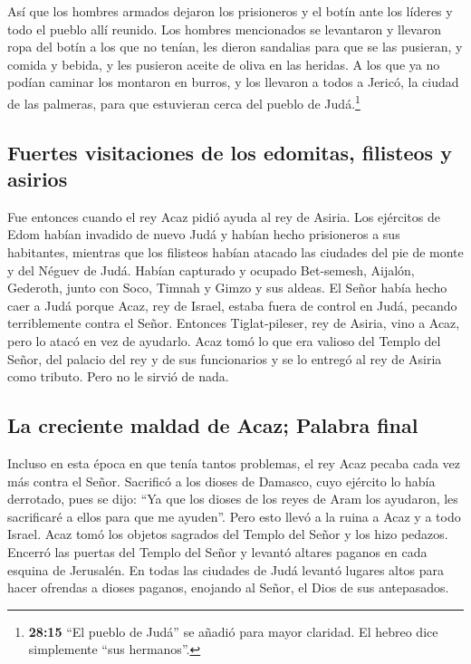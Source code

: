  Así que los hombres armados dejaron los prisioneros y el
botín ante los líderes y todo el pueblo allí reunido. 
Los hombres mencionados se levantaron y llevaron ropa del botín a los
que no tenían, les dieron sandalias para que se las pusieran, y comida y
bebida, y les pusieron aceite de oliva en las heridas. A los que ya no
podían caminar los montaron en burros, y los llevaron a todos a Jericó,
la ciudad de las palmeras, para que estuvieran cerca del pueblo de
Judá.\footnote{\textbf{28:15} ``El pueblo de Judá'' se añadió para mayor
  claridad. El hebreo dice simplemente ``sus hermanos''.}

\hypertarget{fuertes-visitaciones-de-los-edomitas-filisteos-y-asirios}{%
\subsection{Fuertes visitaciones de los edomitas, filisteos y
asirios}\label{fuertes-visitaciones-de-los-edomitas-filisteos-y-asirios}}

 Fue entonces cuando el rey Acaz pidió ayuda al rey de
Asiria.  Los ejércitos de Edom habían invadido de nuevo
Judá y habían hecho prisioneros a sus habitantes, 
mientras que los filisteos habían atacado las ciudades del pie de monte
y del Néguev de Judá. Habían capturado y ocupado Bet-semesh, Aijalón,
Gederoth, junto con Soco, Timnah y Gimzo y sus aldeas. 
El Señor había hecho caer a Judá porque Acaz, rey de Israel, estaba
fuera de control en Judá, pecando terriblemente contra el Señor.
 Entonces Tiglat-pileser, rey de Asiria, vino a Acaz,
pero lo atacó en vez de ayudarlo.  Acaz tomó lo que era
valioso del Templo del Señor, del palacio del rey y de sus funcionarios
y se lo entregó al rey de Asiria como tributo. Pero no le sirvió de
nada.

\hypertarget{la-creciente-maldad-de-acaz-palabra-final}{%
\subsection{La creciente maldad de Acaz; Palabra
final}\label{la-creciente-maldad-de-acaz-palabra-final}}

 Incluso en esta época en que tenía tantos problemas, el
rey Acaz pecaba cada vez más contra el Señor.  Sacrificó
a los dioses de Damasco, cuyo ejército lo había derrotado, pues se dijo:
``Ya que los dioses de los reyes de Aram los ayudaron, les sacrificaré a
ellos para que me ayuden''. Pero esto llevó a la ruina a Acaz y a todo
Israel.  Acaz tomó los objetos sagrados del Templo del
Señor y los hizo pedazos. Encerró las puertas del Templo del Señor y
levantó altares paganos en cada esquina de Jerusalén.  En
todas las ciudades de Judá levantó lugares altos para hacer ofrendas a
dioses paganos, enojando al Señor, el Dios de sus antepasados.

